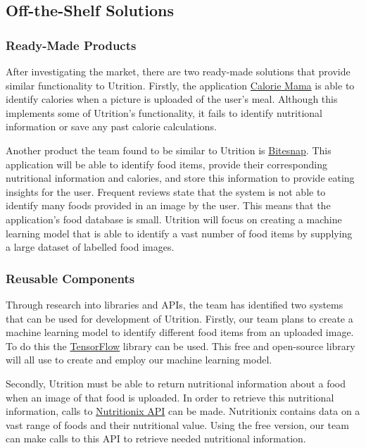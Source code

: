 \documentclass[12pt]{article}
\begin{document}
\subsection{Off-the-Shelf Solutions}
\subsubsection{Ready-Made Products}
After investigating the market, there are two ready-made solutions that provide similar functionality to Utrition. Firstly, the application \href{https://www.caloriemama.ai/#Categories}{Calorie Mama} is able to identify calories when a picture is uploaded of the user's meal. Although this implements some of Utrition's functionality, it fails to identify nutritional information or save any past calorie calculations.

Another product the team found to be similar to Utrition is \href{https://play.google.com/store/apps/details?id=ai.bite.biteapp&hl=en_US&gl=US}{Bitesnap}. This application will be able to identify food items, provide their corresponding nutritional information and calories, and store this information to provide eating insights for the user. Frequent reviews state that the system is not able to identify many foods provided in an image by the user. This means that the application's food database is small. Utrition will focus on creating a machine learning model that is able to identify a vast number of food items by supplying a large dataset of labelled food images. 

\subsubsection{Reusable Components}
Through research into libraries and APIs, the team has identified two systems that can be used for development of Utrition. Firstly, our team plans to create a machine learning model to identify different food items from an uploaded image. To do this the \href{https://www.tensorflow.org/}{TensorFlow} library can be used. This free and open-source library will all use to create and employ our machine learning model.

Secondly, Utrition must be able to return nutritional information about a food when an image of that food is uploaded. In order to retrieve this nutritional information, calls to \href{https://www.nutritionix.com/business/api}{Nutritionix API} can be made. Nutritionix contains data on a vast range of foods and their nutritional value. Using the free version, our team can make calls to this API to retrieve needed nutritional information.
\end{document}
